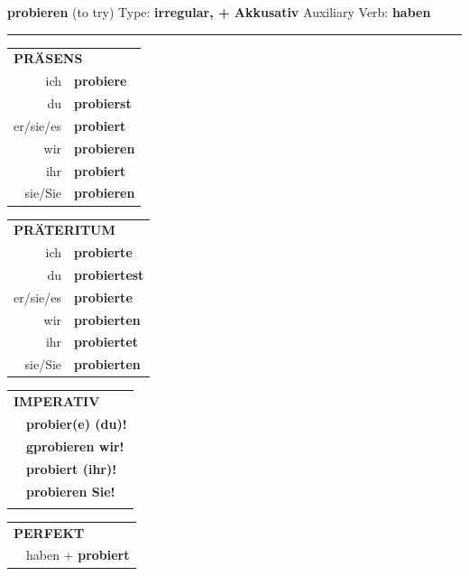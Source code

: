 \documentclass[10pt,a4paper]{revtex4-2}
\begin{document}
\begin{verbbox-acc}
    {\Large \bf probieren} (to try) \hfill Type: \textbf{irregular, + Akkusativ} \hfill Auxiliary Verb: \textbf{haben} 
    
     \vspace{5pt}

    \hrule
    
    \vspace{5pt}

  \begin{tabular}{rl}
     \multicolumn{2}{l}{\textbf{PRÄSENS} }\\
    ich & \textbf{probiere}\\
    du & \textbf{probierst}\\
    er/sie/es & \textbf{probiert}\\
    wir & \textbf{probieren}\\
    ihr & \textbf{probiert}\\
    sie/Sie & \textbf{probieren}\\
  \end{tabular}
  \hfill
     \begin{tabular}{rl}
    \multicolumn{2}{l}{\textbf{PRÄTERITUM} }\\
    ich & \textbf{probierte}\\
    du & \textbf{probiertest}\\
    er/sie/es & \textbf{probierte}\\
    wir & \textbf{probierten}\\
    ihr & \textbf{probiertet}\\
    sie/Sie & \textbf{probierten}\\
  \end{tabular}
  \hfill
  \begin{tabular}{rl}
     \multicolumn{2}{l}{\textbf{IMPERATIV} }\\
   & \textbf{probier(e) (du)!}\\
   & \textbf{gprobieren wir!}\\
   & \textbf{probiert (ihr)!}\\
   & \textbf{probieren Sie!}\\
   & \vspace{10pt}
  \end{tabular}

    \vspace{10pt}

 \begin{tabular}{rl}
     \multicolumn{2}{l}{\textbf{PERFEKT}}\\
   & haben + \textbf{probiert}\\
  \end{tabular}
\hfill
   \begin{tabular}{rl}
   

\end{tabular}
\end{verbbox-acc}
\end{document}
